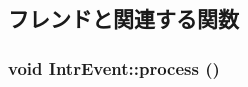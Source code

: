 \subsection{フレンドと関連する関数}
\hypertarget{classSinic_1_1Base_ae03991571cb7e9ffd0046e10275338fb}{
\subsubsection[{IntrEvent::process}]{\setlength{\rightskip}{0pt plus 5cm}void IntrEvent::process ()}}
\label{classSinic_1_1Base_ae03991571cb7e9ffd0046e10275338fb}


